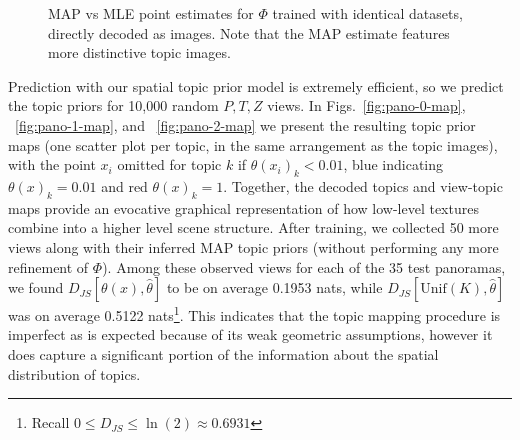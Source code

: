 \begin{figure}
    \centering
    \caption{MAP \protect{} vs MLE \protect{} point estimates for $\Phi$ trained with identical datasets, directly decoded as images. Note that the MAP estimate features more distinctive topic images.}
    \label{fig:map_vs_mle_topics}

\end{figure}

Prediction with our spatial topic prior model is extremely efficient, so we predict the topic priors for 10,000 random $P,T,Z$ views. In Figs.~\ref{fig:pano-0-map}, ~\ref{fig:pano-1-map}, and ~\ref{fig:pano-2-map} we present the resulting topic prior maps (one scatter plot per topic, in the same arrangement as the topic images), with the point $x_i$ omitted for topic $k$ if $\theta(x_i)_k < 0.01$, blue indicating $\theta(x)_k = 0.01$ and red $\theta(x)_k = 1$. Together, the decoded topics and view-topic maps provide an evocative graphical representation of how low-level textures combine into a higher level scene structure. After training, we collected 50 more views along with their inferred MAP topic priors (without performing any more refinement of $\Phi$). Among these observed views for each of the 35 test panoramas, we found $D_{JS}[\theta(x), \hat{\theta}]$ to be on average 0.1953 nats, while $D_{JS}[\mathrm{Unif}(K), \hat{\theta}]$ was on average 0.5122 nats\footnote{Recall $0 \leq D_{JS} \leq \ln(2) \approx 0.6931$}. This indicates that the topic mapping procedure is imperfect as is expected because of its weak geometric assumptions, however it does capture a significant portion of the information about the spatial distribution of topics.

